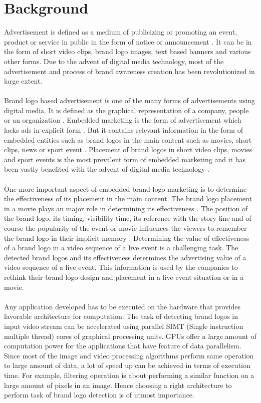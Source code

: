 \section{Background}
Advertisement is defined as a medium of publicizing or promoting an event, product or service in public in the form of notice or announcement \cite{adver7:online}. It can be in the form of short video clips, brand logo images, text based banners and various other forms. Due to the advent of digital media technology, most of the advertisement and process of brand awareness creation has been revolutionized in large extent.\\ \\
Brand logo based advertisement is one of the many forms of advertisements using digital media. It is defined as the graphical representation of a company, people or an organization \cite{What3:online}. Embedded marketing is the form of advertisement which lacks ads in explicit form \cite{baig2013contemporary}. But it contains relevant information in the form of embedded entities such as brand logos in the main content such as movies, short clips, news or sport event \cite{baig2013contemporary}. Placement of brand logos in short video clips, movies and sport events is the most prevalent form of embedded marketing and it has been vastly benefited with the advent of digital media technology 	\cite{baig2013contemporary}.\\ \\
One more important aspect of embedded brand logo marketing is to determine the effectiveness of its placement in the main content. The brand logo placement in a movie plays an major role in determining its effectiveness \cite{JCOM}. The position of the brand logo, its timing, visibility time, its reference with the story line and of course the popularity of the event or movie influences the viewers to remember the brand logo in their implicit memory \cite{JCOM}. Determining the value of effectiveness of a brand logo in a video sequence of a live event is a challenging task. The detected brand logos and its effectiveness determines the advertising value of a video sequence of a live event. This information is used by the companies to rethink their brand logo design and placement in a live event situation or in a movie.\\ \\
Any application developed has to be executed on the hardware that provides favorable architecture for computation. The task of detecting brand logos in input video stream can be accelerated using parallel SIMT (Single instruction multiple thread) cores of graphical processing units. GPUs offer a large amount of computation power for the applications that have feature of data parallelism. Since most of the image and video processing algorithms perform same operation to large amount of data, a lot of speed up can be achieved in terms of execution time. For example, filtering operation is about performing a similar function on a large amount of pixels in an image. Hence choosing a right architecture to perform task of brand logo detection is of utmost importance.        

